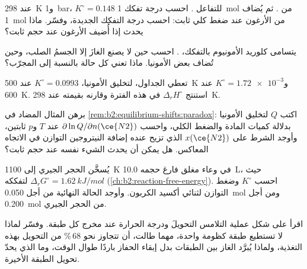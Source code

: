 \begin{exercise}[$\star\star$]\label{exo:b2:equilibrium-shifts:7}
عند \qty{298}{K} و\qty{1}{bar}، $K^\circ = 0.148$ للتفاعل .
احسب درجة تفكك \qty{1}{mol} من . ثم يُضاف
\qty{1}{mol} من الأرغون عند ضغط كلي ثابت: احسب درجة
التفكك الجديدة، وفسّر. ماذا يحدث إذا أُضيف الأرغون عند
حجم ثابت؟
\end{exercise}

\begin{exercise}[$\star\star$]\label{exo:b2:equilibrium-shifts:8}
يتسامى كلوريد الأمونيوم بالتفكك، . احسب  حين لا يصنع الغازَ إلا الجسمُ الصلب، وحين
تُضاف بعض الأمونيا. ماذا تعني كل حالة بالنسبة إلى المجرّب؟
\end{exercise}

\begin{exercise}[$\star\star$]\label{exo:b2:equilibrium-shifts:9}
تعطي الجداول، لتخليق الأمونيا، $K^\circ = 0.0993$ عند \qty{500}{K} 
و$K^\circ = \num{1.72e-3}$ عند \qty{600}{K}. استنتج $\Delta_r H^\circ$ في هذه
الفترة وقارنه بقيمته عند \qty{298}{K}.
\end{exercise}

\begin{exercise}[$\star\star\star$]\label{exo:b2:equilibrium-shifts:10}
برهن المثال المضاد في \cref{rem:b2:equilibrium-shifts:paradox}: اكتب
$Q$ لتخليق الأمونيا بدلالة كميات المادة والضغط الكلي، واحسب
$\partial\ln Q/\partial n(\ce{N2})$ عند $T$ و$p$ ثابتين، وأوجد
الشرط على $x(\ce{N2})$ الذي تزيح عنده إضافة النيتروجين التوازن في الاتجاه
المعاكس. هل يمكن أن يحدث الشيء نفسه عند حجم ثابت؟
\end{exercise}

\begin{exercise}[$\star\star\star$]\label{exo:b2:equilibrium-shifts:11}
يُسخَّن الحجر الجيري إلى \qty{1100}{K} في وعاء مغلق فارغ حجمه
\qty{10.0}{L}، حيث $\Delta_r G^\circ = \qty{1.62}{kJ/mol}$ لتفككه
(\cref{ch:b2:reaction-free-energy}). احسب $K^\circ$ وضغط التوازن لثنائي
أكسيد الكربون. وأوجد الحالة النهائية من أجل
\qty{0.050}{mol} ومن أجل \qty{0.200}{mol} من الحجر الجيري.
\end{exercise}

\begin{exercise}[$\star\star\star$]\label{exo:b2:equilibrium-shifts:12}
اقرأ على شكل عملية التلامس التحويلَ ودرجة الحرارة عند مخرج كل
طبقة. وفسّر لماذا لا تستطيع طبقة كظومة واحدة، مهما طالت، أن تتجاوز نحو
68\,\% من التحويل بهذه التغذية، ولماذا يُبرَّد الغاز بين الطبقات بدل إبقاء
الحفاز باردًا طوال الوقت، وما الذي يحدّ تحويل الطبقة الأخيرة.
\end{exercise}

